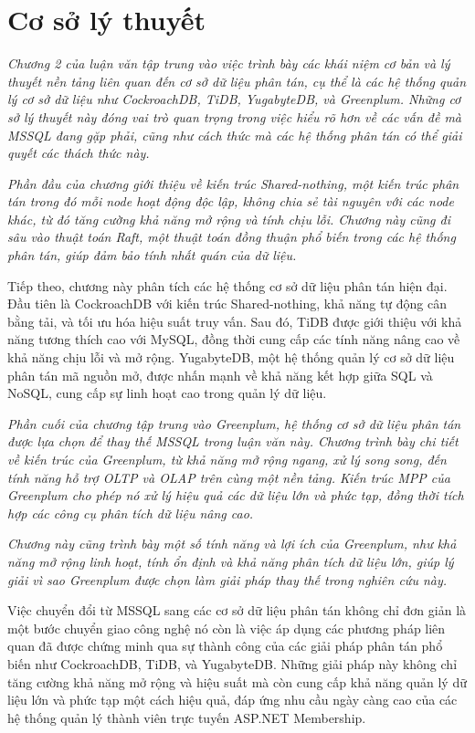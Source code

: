 \documentclass{article}[13pt]
\begin{document}
\section{Cơ sở lý thuyết}


\textit{Chương 2 của luận văn tập trung vào việc trình bày các khái niệm cơ bản và lý thuyết nền tảng liên quan đến cơ sở dữ liệu phân tán, cụ thể là các hệ thống quản lý cơ sở dữ liệu như CockroachDB, TiDB, YugabyteDB, và Greenplum. Những cơ sở lý thuyết này đóng vai trò quan trọng trong việc hiểu rõ hơn về các vấn đề mà MSSQL đang gặp phải, cũng như cách thức mà các hệ thống phân tán có thể giải quyết các thách thức này.}

\textit{Phần đầu của chương giới thiệu về kiến trúc Shared-nothing, một kiến trúc phân tán trong đó mỗi node hoạt động độc lập, không chia sẻ tài nguyên với các node khác, từ đó tăng cường khả năng mở rộng và tính chịu lỗi. Chương này cũng đi sâu vào thuật toán Raft, một thuật toán đồng thuận phổ biến trong các hệ thống phân tán, giúp đảm bảo tính nhất quán của dữ liệu.}

Tiếp theo, chương này phân tích các hệ thống cơ sở dữ liệu phân tán hiện đại. Đầu tiên là CockroachDB với kiến trúc Shared-nothing, khả năng tự động cân bằng tải, và tối ưu hóa hiệu suất truy vấn. Sau đó, TiDB được giới thiệu với khả năng tương thích cao với MySQL, đồng thời cung cấp các tính năng nâng cao về khả năng chịu lỗi và mở rộng. YugabyteDB, một hệ thống quản lý cơ sở dữ liệu phân tán mã nguồn mở, được nhấn mạnh về khả năng kết hợp giữa SQL và NoSQL, cung cấp sự linh hoạt cao trong quản lý dữ liệu.

\textit{Phần cuối của chương tập trung vào Greenplum, hệ thống cơ sở dữ liệu phân tán được lựa chọn để thay thế MSSQL trong luận văn này. Chương trình bày chi tiết về kiến trúc của Greenplum, từ khả năng mở rộng ngang, xử lý song song, đến tính năng hỗ trợ OLTP và OLAP trên cùng một nền tảng. Kiến trúc MPP của Greenplum cho phép nó xử lý hiệu quả các dữ liệu lớn và phức tạp, đồng thời tích hợp các công cụ phân tích dữ liệu nâng cao.}

\textit{Chương này cũng trình bày một số tính năng và lợi ích của Greenplum, như khả năng mở rộng linh hoạt, tính ổn định và khả năng phân tích dữ liệu lớn, giúp lý giải vì sao Greenplum được chọn làm giải pháp thay thế trong nghiên cứu này.}

Việc chuyển đổi từ MSSQL sang các cơ sở dữ liệu phân tán không chỉ đơn giản là một bước chuyển giao công nghệ nó còn là việc áp dụng các phương pháp liên quan đã được chứng minh qua sự thành công của các giải pháp phân tán phổ biến như CockroachDB, TiDB, và YugabyteDB. Những giải pháp này không chỉ tăng cường khả năng mở rộng và hiệu suất mà còn cung cấp khả năng quản lý dữ liệu lớn và phức tạp một cách hiệu quả, đáp ứng nhu cầu ngày càng cao của các hệ thống quản lý thành viên trực tuyến ASP.NET Membership.
\end{document}
